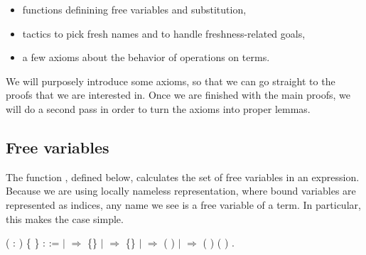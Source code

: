 \documentclass[12pt]{report}
\begin{document}
\begin{itemize}
\item  functions definining free variables and substitution,

\item  tactics to pick fresh names and to handle freshness-related goals,

\item  a few axioms about the behavior of operations on terms.

\end{itemize}


    We will purposely introduce some axioms, so that we can go straight
    to the proofs that we are interested in. Once we are finished with
    the main proofs, we will do a second pass in order to turn the 
    axioms into proper lemmas.

\begin{coqdoccode}
\coqdocemptyline
\end{coqdoccode}
\subsection{Free variables}



 The function , defined below, calculates the set of free
    variables in an expression.  Because we are using locally nameless
    representation, where bound variables are represented as indices,
    any name we see is a free variable of a term.  In particular, this
    makes the  case simple.

\begin{coqdoccode}
\coqdocemptyline
\coqdocnoindent
{}  ( : ) \{ \} :  :=\coqdoceol
\coqdocindent{1.00em}
  \coqdoceol
\coqdocindent{1.00em}
\ensuremath{|}      \ensuremath{\Rightarrow} \{\}\coqdoceol
\coqdocindent{1.00em}
\ensuremath{|}      \ensuremath{\Rightarrow} \{\}\coqdoceol
\coqdocindent{1.00em}
\ensuremath{|}      \ensuremath{\Rightarrow} ( )\coqdoceol
\coqdocindent{1.00em}
\ensuremath{|}    \ensuremath{\Rightarrow} ( )  ( )\coqdoceol
\coqdocindent{1.00em}
.\coqdoceol
\coqdocemptyline
\end{coqdoccode}
\end{document}
